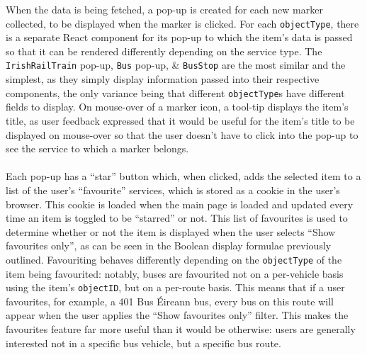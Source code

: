 \documentclass[a4paper,11pt]{report}
\begin{document}
When the data is being fetched, a pop-up is created for each new marker collected, to be displayed when the marker is clicked. 
For each \verb|objectType|, there is a separate React component for its pop-up to which the item's data is passed so that it can be rendered differently depending on the service type.
The \verb|IrishRailTrain| pop-up, \verb|Bus| pop-up, \& \verb|BusStop| are the most similar and the simplest, as they simply display information passed into their respective components, the only variance being that different \verb|objectType|s have different fields to display.
On mouse-over of a marker icon, a tool-tip displays the item's title, as user feedback expressed that it would be useful for the item's title to be displayed on mouse-over so that the user doesn't have to click into the pop-up to see the service to which a marker belongs.
\\\\
Each pop-up has a ``star'' button which, when clicked, adds the selected item to a list of the user's ``favourite'' services, which is stored as a cookie in the user's browser.
This cookie is loaded when the main page is loaded and updated every time an item is toggled to be ``starred'' or not.
This list of favourites is used to determine whether or not the item is displayed when the user selects ``Show favourites only'', as can be seen in the Boolean display formulae previously outlined.
Favouriting behaves differently depending on the \verb|objectType| of the item being favourited:
notably, buses are favourited not on a per-vehicle basis using the item's \verb|objectID|, but on a per-route basis.
This means that if a user favourites, for example, a 401 Bus Éireann bus, every bus on this route will appear when the user applies the ``Show favourites only'' filter.
This makes the favourites feature far more useful than it would be otherwise: users are generally interested not in a specific bus vehicle, but a specific bus route.
\end{document}
